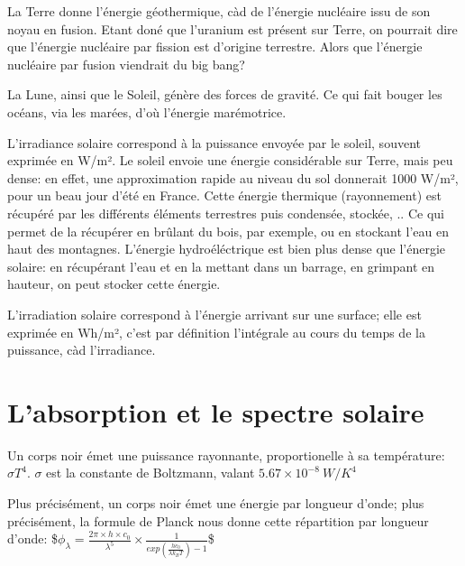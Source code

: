 \documentclass[letterpaper,10pt,english]{sphinxmanual}
\begin{document}
La Terre donne l’énergie géothermique, càd de l’énergie nucléaire issu de son noyau en fusion. Etant doné que l’uranium est présent sur Terre, on pourrait dire que l’énergie nucléaire par fission est d’origine terrestre. Alors que l’énergie nucléaire par fusion viendrait du big bang?

La Lune, ainsi que le Soleil, génère des forces de gravité. Ce qui fait bouger les océans, via les marées, d’où l’énergie marémotrice.

L’irradiance solaire correspond à la puissance envoyée par le soleil, souvent exprimée en W/m². Le soleil envoie une énergie considérable sur Terre, mais peu dense: en effet, une approximation rapide au niveau du sol donnerait 1000 W/m², pour un beau jour d’été en France. Cette énergie thermique (rayonnement) est récupéré par les différents éléments terrestres puis condensée, stockée, .. Ce qui permet de la récupérer en brûlant du bois, par exemple, ou en stockant l’eau en haut des montagnes. L’énergie hydroéléctrique est bien plus dense que l’énergie solaire: en récupérant l’eau et en la mettant dans un barrage, en grimpant en hauteur, on peut stocker cette énergie.

L’irradiation solaire correspond à l’énergie arrivant sur une surface; elle est exprimée en Wh/m², c’est par définition l’intégrale au cours du temps de la puissance, càd l’irradiance.


\section{L’absorption et le spectre solaire}
\label{\detokenize{Part3/Irradiation:l-absorption-et-le-spectre-solaire}}
Un corps noir émet une puissance rayonnante, proportionelle à sa température: \(\sigma T^4\). \(\sigma\) est la constante de Boltzmann, valant \(5.67 \times 10^{-8} \ W/K^4\)

Plus précisément, un corps noir émet une énergie par longueur d’onde; plus précisément, la formule de Planck nous donne cette répartition par longueur d’onde:
\$\(
\phi_{\lambda} = \frac{2 \pi \times h \times c_0}{\lambda^5} \times \frac{1}{exp(\frac{h \dot c_0}{\lambda k_B T})-1}
\)\$
\end{document}
